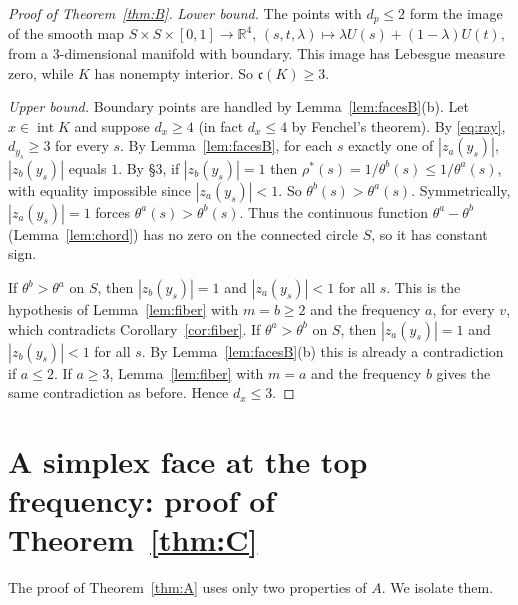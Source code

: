 \documentclass[11pt]{amsart}
\theoremstyle{remark}
\newcommand{\R}{\mathbb{R}}
\newcommand{\cc}{\mathfrak{c}}
\newcommand{\inter}{\operatorname{int}}
\begin{document}
\begin{proof}[Proof of Theorem~\ref{thm:B}]
\emph{Lower bound.} The points with $d_p\le2$ form the image of the smooth map $S\times S\times[0,1]\to\R^4$, $(s,t,\lambda)\mapsto\lambda U(s)+(1-\lambda)U(t)$, from a
$3$-dimensional manifold with boundary. This image has Lebesgue measure zero, while $K$ has nonempty interior. So $\cc(K)\ge3$.

\emph{Upper bound.} Boundary points are handled by Lemma~\ref{lem:facesB}(b). Let $x\in\inter K$ and suppose $d_x\ge4$ (in fact $d_x\le4$ by Fenchel's theorem). By \eqref{eq:ray}, $d_{y_s}\ge3$ for every
$s$. By Lemma~\ref{lem:facesB}, for each $s$ exactly one of $|z_a(y_s)|$, $|z_b(y_s)|$ equals $1$. By \S3, if $|z_b(y_s)|=1$ then $\rho^\ast(s)=1/\theta^b(s)\le1/\theta^a(s)$,
with equality impossible since $|z_a(y_s)|<1$. So $\theta^b(s)>\theta^a(s)$. Symmetrically, $|z_a(y_s)|=1$ forces $\theta^a(s)>\theta^b(s)$. Thus the continuous function
$\theta^a-\theta^b$ (Lemma~\ref{lem:chord}) has no zero on the connected circle $S$, so it has constant sign.

If $\theta^b>\theta^a$ on $S$, then $|z_b(y_s)|=1$ and $|z_a(y_s)|<1$ for all $s$. This is the hypothesis of Lemma~\ref{lem:fiber} with $m=b\ge2$ and the frequency $a$, for every
$v$, which contradicts Corollary~\ref{cor:fiber}. If $\theta^a>\theta^b$ on $S$, then $|z_a(y_s)|=1$ and $|z_b(y_s)|<1$ for all $s$. By Lemma~\ref{lem:facesB}(b) this is already a contradiction if $a\le2$.
If $a\ge3$, Lemma~\ref{lem:fiber} with $m=a$ and the frequency $b$ gives the same contradiction as before. Hence $d_x\le3$.
\end{proof}

\section{A simplex face at the top frequency: proof of Theorem~\ref{thm:C}}

The proof of Theorem~\ref{thm:A} uses only two properties of $A$. We isolate them.
\end{document}
